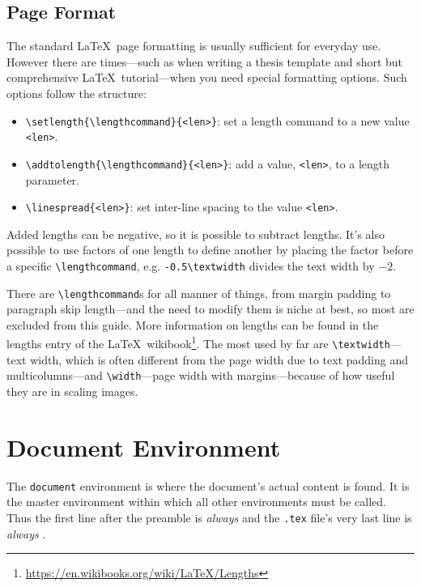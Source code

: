\subsection{Page Format}
%
The standard \LaTeX~page formatting is usually sufficient for everyday use. However there are times---such as when writing a thesis template and short but comprehensive \LaTeX~tutorial---when you need special formatting options. Such options follow the structure:
\begin{itemize}
    \item \verb|\setlength{\lengthcommand}{<len>}|: set a length command to a new value \verb|<len>|.
    \item \verb|\addtolength{\lengthcommand}{<len>}|: add a value, \verb|<len>|, to a length parameter.
    \item \verb|\linespread{<len>}|: set inter-line spacing to the value \verb|<len>|.
\end{itemize}
Added lengths can be negative, so it is possible to subtract lengths. It's also possible to use factors of one length to define another by placing the factor before a specific \verb|\lengthcommand|, e.g. \verb|-0.5\textwidth| divides the text width by $-2$.

There are \verb|\lengthcommand|s for all manner of things, from margin padding to paragraph skip length---and the need to modify them is niche at best, so most are excluded from this guide. More information on lengths can be found in the lengths entry of the \LaTeX~wikibook\footnote{\url{https://en.wikibooks.org/wiki/LaTeX/Lengths}}. The most used by far are \verb|\textwidth|---text width, which is often different from the page width due to text padding and multicolumns---and \verb|\width|---page width with margins---because of how useful they are in scaling images.
%
\section{Document Environment}
%
The \verb|document| environment is where the document's actual content is found. It is the master environment within which all other environments must be called. Thus the first line after the preamble is \emph{always} \verb|| and the \texttt{.tex} file's very last line is \emph{always} \verb||.
%
